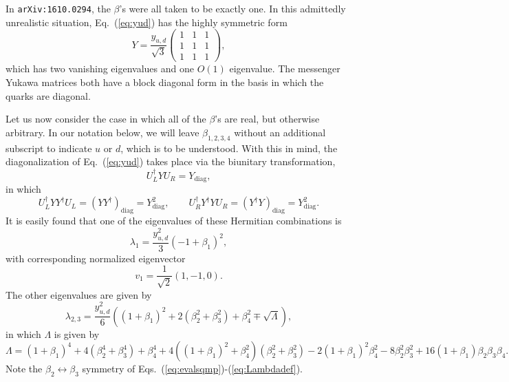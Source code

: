 \documentclass[12pt]{article}
\begin{document}
In {\tt arXiv:1610.0294}, the $\beta$'s were all taken to be exactly one.  In this admittedly unrealistic situation, Eq.~(\ref{eq:yud}) has the highly symmetric form
\begin{equation}
Y = \frac{y_{u,d}}{\sqrt{3}} \left (\begin{array}{ccc} 1 &1 & 1 \\ 1 & 1 & 1 \\ 1 & 1 & 1           \end{array} \right ),
\end{equation}
which has two vanishing eigenvalues and one $O(1)$ eigenvalue.  The messenger Yukawa matrices both have a block diagonal form in the basis in which the quarks are diagonal. 

Let us now consider the case in which all of the $\beta$'s are real, but otherwise arbitrary. In our notation below, we will leave $\beta_{1,2,3,4}$ without an additional subscript to indicate $u$ or $d$, which is to be understood. With this in mind, the diagonalization of Eq.~(\ref{eq:yud}) takes place via the biunitary transformation,
\begin{equation}
U_L^\dagger Y U_R =Y_\text{diag},  
\end{equation}
in which
\begin{equation}
U_L^\dagger Y Y^\dagger U_L= (YY^\dagger)_\text{diag} =Y^2_\text{diag}, \qquad U_R^\dagger Y^\dagger Y U_R= (Y^\dagger Y)_\text{diag}= Y^2_\text{diag}.
\end{equation}
It is easily found that one of the eigenvalues of these Hermitian combinations is 
\begin{equation}
\lambda_1=\frac{y_{u,d}^2}{3}(-1+\beta_1)^2, 
\label{eq:evalsq1}
\end{equation}
with corresponding normalized eigenvector 
\begin{equation}
v_1=\frac{1}{\sqrt{2}}(1,-1,0).  
\end{equation}
The other eigenvalues are given by
\begin{equation}
\lambda_{2,3}= \frac{y_{u,d}^2}{6} \left ((1+\beta_1)^2+2(\beta_2^2+\beta_3^2)+ \beta_4^2 \mp \sqrt{\Lambda} \right ),
\label{eq:evalsqmp}
\end{equation}
in which $\Lambda$ is given by
\begin{equation}
\Lambda = (1+\beta_1)^4+4(\beta_2^4+\beta_3^4)+\beta_4^4+4((1+\beta_1)^2+\beta_4^2)(\beta_2^2+\beta_3^2)-2(1+\beta_1)^2\beta_4^2-8\beta_2^2\beta_3^2+16(1+\beta_1)\beta_2\beta_3 \beta_4.
\label{eq:Lambdadef}
\end{equation}
Note the $\beta_2\leftrightarrow \beta_3$ symmetry of Eqs.~(\ref{eq:evalsqmp})-(\ref{eq:Lambdadef}).  
\end{document}
